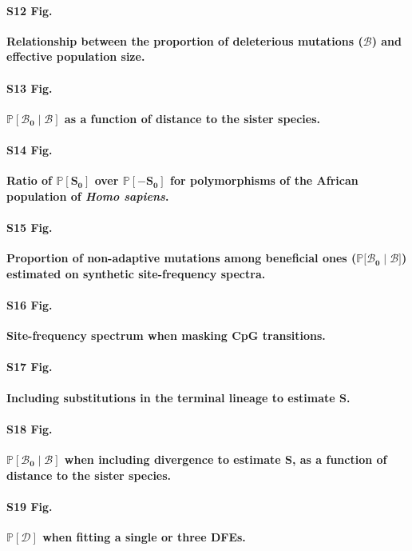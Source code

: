 \documentclass[10pt,letterpaper]{article}
\newcommand{\proba}{\mathbb{P}}
\newcommand{\Sphy}{S_{0}}
\newcommand{\SphyBen}{\mathcal{B}_0}
\newcommand{\given}{\mid}
\newcommand{\Spop}{S}
\newcommand{\SpopDel}{\mathcal{D}}
\newcommand{\SpopBen}{\mathcal{B}}
\begin{document}
\paragraph*{S12 Fig.}
\label{S12_Fig}
{\bf Relationship between the proportion of deleterious mutations ($\bm{\SpopBen}$) and effective population size.}

\paragraph*{S13 Fig.}
\label{S13_Fig}
{\bf $\bm{\proba[\SphyBen\given \SpopBen ]}$ as a function of distance to the sister species.}

\paragraph*{S14 Fig.}
\label{S14_Fig}
{\bf Ratio of $\bm{\proba[\Sphy]}$ over $\bm{\proba[-\Sphy]}$ for polymorphisms of the African population of \textit{Homo sapiens}.}

\paragraph*{S15 Fig.}
\label{S15_Fig}
{\bf Proportion of non-adaptive mutations among beneficial ones ($\bm{\proba{[}\SphyBen\given \SpopBen {]}}$) estimated on synthetic site-frequency spectra.}

\paragraph*{S16 Fig.}
\label{S16_Fig}
{\bf Site-frequency spectrum when masking CpG transitions.}

\paragraph*{S17 Fig.}
\label{S17_Fig}
{\bf Including substitutions in the terminal lineage to estimate $\bm{\Spop}$.}

\paragraph*{S18 Fig.}
\label{S18_Fig}
{\bf $\bm{\proba[\SphyBen\given \SpopBen ]}$ when including divergence to estimate $\bm{\Spop}$, as a function of distance to the sister species.}

\paragraph*{S19 Fig.}
\label{S19_Fig}
{\bf $\bm{\proba [ \SpopDel ]}$ when fitting a single or three DFEs.}
\end{document}
